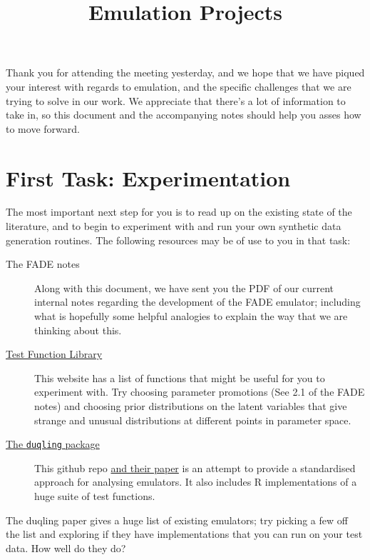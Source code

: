 \documentclass[11pt]{article}
\title{\vspace{-1cm}Emulation Projects}
\date{}
\begin{document}
	\maketitle

	\vspace{-1cm}

	Thank you for attending the meeting yesterday, and we hope that we have piqued your interest with regards to emulation, and the specific challenges that we are trying to solve in our work. We appreciate that there's a lot of information to take in, so this document and the accompanying notes should help you asses how to move forward.




	\section{First Task: Experimentation}
		The most important next step for you is to read up on the existing state of the literature, and to begin to experiment with and run your own synthetic data generation routines. The following resources may be of use to you in that task:

		\begin{description}
			\item[The FADE notes] Along with this document, we have sent you the PDF of our current internal notes regarding the development of the FADE emulator; including what is hopefully some helpful analogies to explain the way that we are thinking about this.
			\item[\href{https://www.sfu.ca/~ssurjano/index.html}{Test Function Library}] This website has a list of functions that might be useful for you to experiment with. Try choosing parameter promotions (See 2.1 of the FADE notes) and choosing prior distributions on the latent variables that give strange and unusual distributions at different points in parameter space.
			\item[\href{https://github.com/knrumsey/duqling}{The \texttt{duqling} package}] This github repo \href{https://arxiv.org/html/2512.09060v2}{and their paper} is an attempt to provide a standardised approach for analysing emulators. It also includes R implementations of a huge suite of test functions.
		\end{description}

		The duqling paper gives a huge list of existing emulators; try picking a few off the list and exploring if they have implementations that you can run on your test data. How well do they do?
\end{document}
